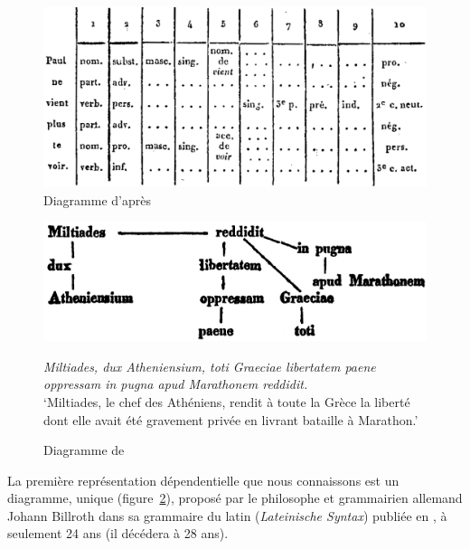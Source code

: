 {    \begin{figure}[H]
    \caption{\label{fig:Gaultier1829}Diagramme d'après \citet{gaultier1817atlas}}
    \includegraphics[width=\textwidth]{figures/Gaultier-conll.png}
    \end{figure}
    
    \begin{figure}[H]
    \caption{Diagramme de \citet[102]{Billroth1832}\label{fig:Billroth1832}}
    \includegraphics[width=.75\textwidth]{figures/Billroth1832.png}\smallskip\\    
    \noindent\parbox{.75\textwidth}{\small\textit{Miltiades, dux Atheniensium, toti Graeciae libertatem paene oppressam in pugna apud Marathonem reddidit.}\\
    ‘Miltiades, le chef des Athéniens, rendit à toute la Grèce la liberté dont elle avait été gravement privée en livrant bataille à Marathon.’}
    \end{figure}
 
    La première représentation dépendentielle que nous connaissons est un diagramme, unique (figure~\ref{fig:Billroth1832}), proposé par le philosophe et grammairien allemand Johann Billroth dans sa grammaire du latin (\textit{Lateinische Syntax}) publiée en \citeyear{Billroth1832}, à seulement 24 ans (il décédera à 28 ans).
    
}
